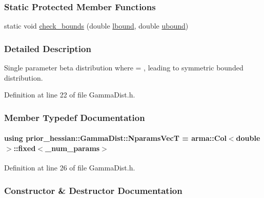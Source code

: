\subsubsection*{Static Protected Member Functions}
\begin{DoxyCompactItemize}
\item 
static void \hyperlink{classprior__hessian_1_1UnivariateDist_aec85554be4019eb2c5d92203a4e6d9f8}{check\+\_\+bounds} (double \hyperlink{classprior__hessian_1_1GammaDist_ade738352c5a0e12da9d4fd2a09aafbf7}{lbound}, double \hyperlink{classprior__hessian_1_1GammaDist_a7292a1f23badc19d8c608d3a32fc6400}{ubound})
\end{DoxyCompactItemize}


\subsubsection{Detailed Description}
Single parameter beta distribution where  = , leading to symmetric bounded distribution. 



Definition at line 22 of file Gamma\+Dist.\+h.



\subsubsection{Member Typedef Documentation}
\paragraph[{\texorpdfstring{Nparams\+VecT}{NparamsVecT}}]{\setlength{\rightskip}{0pt plus 5cm}using {\bf prior\+\_\+hessian\+::\+Gamma\+Dist\+::\+Nparams\+VecT} =  arma\+::\+Col$<$double$>$\+::fixed$<$\+\_\+num\+\_\+params$>$}\hypertarget{classprior__hessian_1_1GammaDist_a01fd80ddf66dbb4eedb73e5ee272e838}{}\label{classprior__hessian_1_1GammaDist_a01fd80ddf66dbb4eedb73e5ee272e838}


Definition at line 26 of file Gamma\+Dist.\+h.



\subsubsection{Constructor \& Destructor Documentation}
